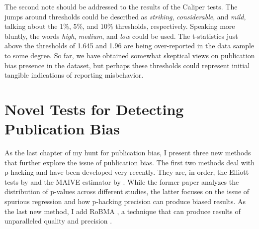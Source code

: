 The second note should be addressed to the results of the Caliper tests. The jumps around thresholds could be described as \textit{striking}, \textit{considerable}, and \textit{mild}, talking about the 1\%, 5\%, and 10\% thresholds, respectively. Speaking more bluntly, the words \textit{high}, \textit{medium}, and \textit{low} could be used. The t-statistics just above the thresholds of 1.645 and 1.96 are being over-reported in the data sample to some degree. So far, we have obtained somewhat skeptical views on publication bias presence in the dataset, but perhaps these thresholds could represent initial tangible indications of reporting misbehavior.

\section{Novel Tests for Detecting Publication Bias}
\label{sec:phacking}

As the last chapter of my hunt for publication bias, I present three new methods that further explore the issue of publication bias. The first two methods deal with p-hacking and have been developed very recently. They are, in order, the Elliott tests by \cite{elliott2022hacking} and the \ac{MAIVE} estimator by \cite{irsova2023maive}. While the former paper analyzes the distribution of p-values across different studies, the latter focuses on the issue of spurious regression and how p-hacking precision can produce biased results. As the last new method, I add \ac{RoBMA} \citep{maier2022robust}, a technique that can produce results of unparalleled quality and precision \citep{bartovs2023robust}.


